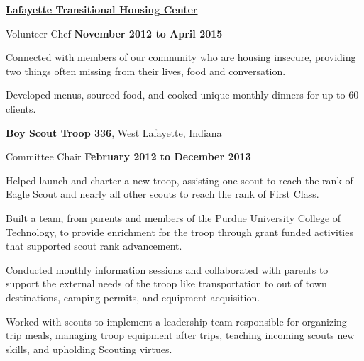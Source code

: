 \documentclass[10pt]{article}
\newcommand{\blankline}{\quad\pagebreak[3]}
\begin{document}
    \href{http://www.lthc.net/}{\textbf{Lafayette Transitional Housing Center}}
    \begin{outerlist}

        \item[] Volunteer Chef %
                \hfill \textbf{November 2012 to April 2015}

                \begin{innerlist}
                    \item Connected with members of our community who are housing insecure, providing two things often missing from their lives, food and conversation.
                    \item Developed menus, sourced food, and cooked unique monthly dinners for up to 60 clients.
                \end{innerlist}

    \end{outerlist}

    \blankline

    \textbf{Boy Scout Troop 336}, West Lafayette, Indiana
    \begin{outerlist}

        \item[] Committee Chair %
                \hfill \textbf{February 2012 to December 2013}

                \begin{innerlist}
                    \item Helped launch and charter a new troop, assisting one scout to
                          reach the rank of Eagle Scout and nearly all other scouts to reach
                          the rank of First Class.
                    \item Built a team, from parents and members of the Purdue University
                          College of Technology, to provide enrichment for the troop through
                          grant funded activities that supported scout rank advancement.
                    \item Conducted monthly information sessions and
                          collaborated with parents to support the external
                          needs of the troop like transportation to out of
                          town destinations, camping permits, and equipment
                          acquisition.
                    \item Worked with scouts to implement a leadership team
                          responsible for organizing trip meals, managing troop equipment
                          after trips, teaching incoming scouts new skills, and upholding
                          Scouting virtues.
                \end{innerlist}

    \end{outerlist}
\end{document}
